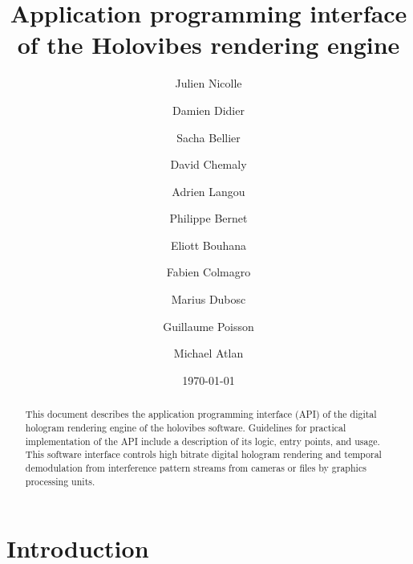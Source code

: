 \documentclass[
 reprint,
 superscriptaddress,
 amsmath,
 amssymb,
 aps,
]{revtex4-2}
\begin{document}
\title{Application programming interface of the Holovibes rendering engine}

\author{Julien Nicolle}
\author{Damien Didier}
\author{Sacha Bellier}
\author{David Chemaly}
\author{Adrien Langou}
\author{Philippe Bernet}
\author{Eliott Bouhana}
\author{Fabien Colmagro}
\author{Marius Dubosc}
\author{Guillaume Poisson}
\author{Michael Atlan}

\date{\today}

\begin{abstract}
This document describes the application programming interface (API) of the digital hologram rendering engine of the holovibes software. Guidelines for practical implementation of the API include a description of its logic, entry points, and usage. This software interface controls high bitrate digital hologram rendering and temporal demodulation from interference pattern streams from cameras or files by graphics processing units.
\end{abstract}

\maketitle

\tableofcontents

\section{\label{sec:intro} Introduction}
\end{document}
